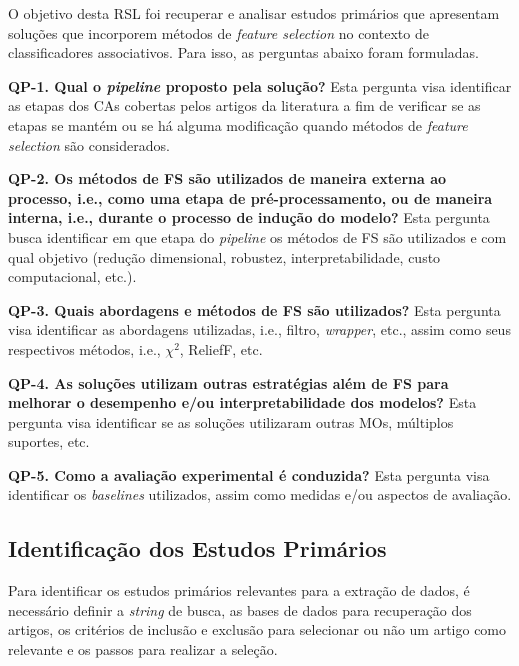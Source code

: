 O objetivo desta RSL foi recuperar e analisar estudos primários que apresentam soluções que incorporem métodos de \textit{feature selection} no contexto de classificadores associativos. Para isso, as perguntas abaixo foram formuladas.

\textbf{QP-1. Qual o \textit{pipeline} proposto pela solução?} Esta pergunta visa identificar as etapas dos CAs cobertas pelos artigos da literatura a fim de verificar se as etapas se mantém ou se há alguma modificação quando métodos de \textit{feature selection} são considerados.


\textbf{QP-2. Os métodos de FS são utilizados de maneira externa ao processo, i.e., como uma etapa de pré-processamento, ou de maneira interna, i.e., durante o processo de indução do modelo?} Esta pergunta busca identificar em que etapa do \textit{pipeline} os métodos de FS são utilizados e com qual objetivo (redução dimensional, robustez, interpretabilidade, custo computacional, etc.).
    
\textbf{QP-3. Quais abordagens e métodos de FS são utilizados?} Esta pergunta visa identificar as abordagens utilizadas, i.e., filtro, \textit{wrapper}, etc., assim como seus respectivos métodos, i.e., $\chi^2$, ReliefF, etc.
    
\textbf{QP-4. As soluções utilizam outras estratégias além de FS para melhorar o desempenho e/ou interpretabilidade dos modelos?} Esta pergunta visa identificar se as soluções utilizaram outras MOs, múltiplos suportes, etc.
    
\textbf{QP-5. Como a avaliação experimental é conduzida?} Esta pergunta visa identificar os \textit{baselines} utilizados, assim como medidas e/ou aspectos de avaliação.



\subsection{Identificação dos Estudos Primários}\label{sec:busca_selecao}

Para identificar os estudos primários relevantes para a extração de dados, é necessário definir a \textit{string} de busca, as bases de dados para recuperação dos artigos, os critérios de inclusão e exclusão para selecionar ou não um artigo como relevante e os passos para realizar a seleção.

